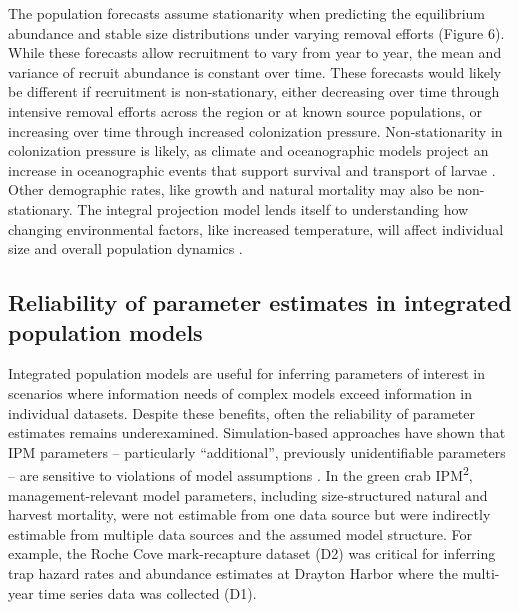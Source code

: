 \documentclass{article}
\begin{document}
The population forecasts assume stationarity when predicting the equilibrium abundance and stable size distributions under varying removal efforts (Figure 6). While these forecasts allow recruitment to vary from year to year, the mean and variance of recruit abundance is constant over time. These forecasts would likely be different if recruitment is non-stationary, either decreasing over time through intensive removal efforts across the region or at known source populations, or increasing over time through increased colonization pressure. Non-stationarity in colonization pressure is likely, as climate and oceanographic models project an increase in oceanographic events that support survival and transport of larvae \parencite{du2024dispersal, cai2021changing}. Other demographic rates, like growth and natural mortality may also be non-stationary. The integral projection model lends itself to understanding how changing environmental factors, like increased temperature, will affect individual size and overall population dynamics \parencite{plard2019ipm, dahlgren2011incorporating}. 

\subsection{Reliability of parameter estimates in integrated population models}

Integrated population models are useful for inferring parameters of interest in scenarios where information needs of complex models exceed information in individual datasets. Despite these benefits, often the reliability of parameter estimates remains underexamined. Simulation-based approaches have shown that IPM parameters -- particularly “additional”, previously unidentifiable parameters -- are sensitive to violations of model assumptions \parencite{riecke2019integrated}. In the green crab IPM\textsuperscript{2}, management-relevant model parameters, including size-structured natural and harvest mortality, were not estimable from one data source but were indirectly estimable from multiple data sources and the assumed model structure. For example, the Roche Cove mark-recapture dataset (D2) was critical for inferring trap hazard rates and abundance estimates at Drayton Harbor where the multi-year time series data was collected (D1).
\end{document}
